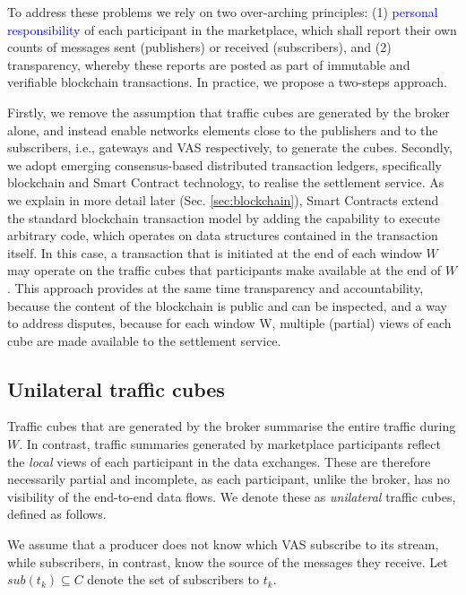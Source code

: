 \documentclass[chi_draft]{sigchi}
\begin{document}
To address these problems we rely on two over-arching principles: (1) \textcolor{blue}{personal responsibility} of each participant in the marketplace, which shall report their own counts of messages sent (publishers) or received (subscribers), and (2) transparency, whereby these reports are posted as part of immutable and verifiable blockchain transactions.
In practice, we propose a two-steps approach.
%

Firstly, we remove the assumption that traffic cubes are generated by the broker alone, and instead enable networks elements close to the publishers and to the subscribers, i.e., gateways and VAS respectively, to generate the cubes.
%
Secondly, we adopt emerging consensus-based distributed transaction ledgers, specifically blockchain and Smart Contract technology, to realise the settlement service.
As we explain in more detail later (Sec. \ref{sec:blockchain}), Smart Contracts extend the standard blockchain transaction model by adding the capability to execute arbitrary code, which operates on data structures contained in the transaction itself. 
In this case, a transaction that is initiated at the end of each window $W$ may operate on the traffic cubes that participants make available at the end of $W$.
This  approach provides at the same time transparency and accountability, because the content of the blockchain is public and can be inspected, and a way to address disputes, because for each window W, multiple (partial) views of each cube are made available to the settlement service.

\subsection{Unilateral traffic cubes} \label{sec:u-cubes}

Traffic cubes that are generated by the broker summarise the entire traffic during $W$.
In contrast, traffic summaries generated by marketplace participants reflect the \textit{local} views of each participant in the data exchanges.
These are therefore necessarily partial and incomplete, as each participant, unlike the broker, has no visibility of the end-to-end data flows. 
We denote these as \textit{unilateral} traffic cubes, defined as follows.

We assume that a producer does not know which VAS subscribe to its stream, while subscribers, in contrast, know the source of the messages they receive. 
Let $\mathit{sub}(t_k) \subseteq C $ denote the set of subscribers to $t_k$.
\end{document}
